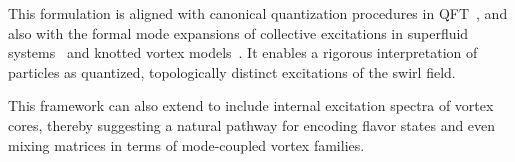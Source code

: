 This formulation is aligned with canonical quantization procedures in QFT~\cite{verlinde2021qft}, and also with the formal mode expansions of collective excitations in superfluid systems~\cite{pethick2002bose} and knotted vortex models~\cite{kleckner2013creation}. It enables a rigorous interpretation of particles as quantized, topologically distinct excitations of the swirl field.

This framework can also extend to include internal excitation spectra of vortex cores, thereby suggesting a natural pathway for encoding flavor states and even mixing matrices in terms of mode-coupled vortex families.
